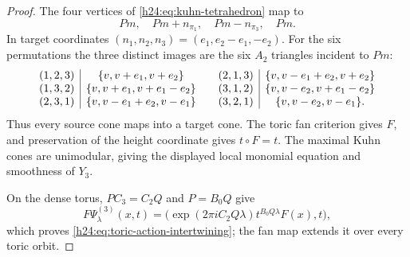 \begin{proof}
The four vertices of \eqref{h24:eq:kuhn-tetrahedron} map to
\[
 Pm,\quad Pm+n_{\pi_1},\quad Pm-n_{\pi_3},\quad Pm.
\]
In target coordinates
$(n_1,n_2,n_3)=(e_1,e_2-e_1,-e_2)$.  For the six permutations the three
distinct images are the six $A_2$ triangles incident to $Pm$:
\[
\begin{array}{c|c@{\qquad}c|c}
(1,2,3)&\{v,v+e_1,v+e_2\}&(2,1,3)&\{v,v-e_1+e_2,v+e_2\}\\
(1,3,2)&\{v,v+e_1,v+e_1-e_2\}&(3,1,2)&\{v,v-e_2,v+e_1-e_2\}\\
(2,3,1)&\{v,v-e_1+e_2,v-e_1\}&(3,2,1)&\{v,v-e_2,v-e_1\}.
\end{array}
\]
Thus every source cone maps into a target cone.  The toric fan criterion
gives $F$, and preservation of the height coordinate gives $t\circ F=t$.
The maximal Kuhn cones are unimodular, giving the displayed local monomial
equation and smoothness of $Y_3$.

On the dense torus, $PC_3=C_2Q$ and $P=B_0Q$ give
\[
 F\Psi^{(3)}_\lambda(x,t)
 =\bigl(\exp(2\pi iC_2Q\lambda)t^{B_0Q\lambda}F(x),t\bigr),
\]
which proves \eqref{h24:eq:toric-action-intertwining}; the fan map extends it
over every toric orbit.


\end{proof}
